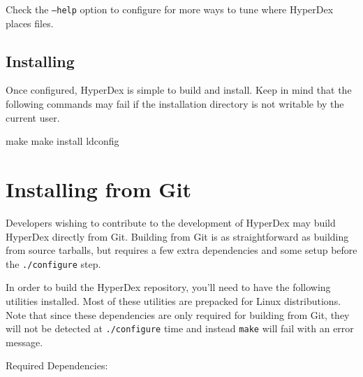Check the \texttt{--help} option to configure for more ways to tune where
HyperDex places files.

\subsection{Installing}

Once configured, HyperDex is simple to build and install.  Keep in mind that the
following commands may fail if the installation directory is not writable by the
current user.

\begin{consolecode}
make
make install
ldconfig
\end{consolecode}

\section{Installing from Git}

Developers wishing to contribute to the development of HyperDex may build
HyperDex directly from Git.  Building from Git is as straightforward as building
from source tarballs, but requires a few extra dependencies and some setup
before the \texttt{./configure} step.

In order to build the HyperDex repository, you'll need to have the following
utilities installed.  Most of these utilities are prepacked for Linux
distributions.  Note that since these dependencies are only required for
building from Git, they will not be detected at \texttt{./configure} time and
instead \texttt{make} will fail with an error message.

Required Dependencies:

